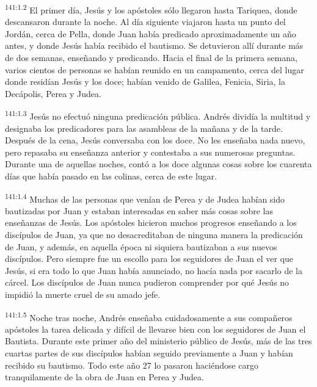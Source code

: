 \par 
\textsuperscript{141:1.2} El primer día, Jesús y los apóstoles sólo llegaron hasta Tariquea, donde descansaron durante la noche. Al día siguiente viajaron hasta un punto del Jordán, cerca de Pella, donde Juan había predicado aproximadamente un año antes, y donde Jesús había recibido el bautismo. Se detuvieron allí durante más de dos semanas, enseñando y predicando. Hacia el final de la primera semana, varios cientos de personas se habían reunido en un campamento, cerca del lugar donde residían Jesús y los doce; habían venido de Galilea, Fenicia, Siria, la Decápolis, Perea y Judea.

\par 
\textsuperscript{141:1.3} Jesús no efectuó ninguna predicación pública. Andrés dividía la multitud y designaba los predicadores para las asambleas de la mañana y de la tarde. Después de la cena, Jesús conversaba con los doce. No les enseñaba nada nuevo, pero repasaba su enseñanza anterior y contestaba a sus numerosas preguntas. Durante una de aquellas noches, contó a los doce algunas cosas sobre los cuarenta días que había pasado en las colinas, cerca de este lugar.

\par 
\textsuperscript{141:1.4} Muchas de las personas que venían de Perea y de Judea habían sido bautizadas por Juan y estaban interesadas en saber más cosas sobre las enseñanzas de Jesús. Los apóstoles hicieron muchos progresos enseñando a los discípulos de Juan, ya que no desacreditaban de ninguna manera la predicación de Juan, y además, en aquella época ni siquiera bautizaban a sus nuevos discípulos. Pero siempre fue un escollo para los seguidores de Juan el ver que Jesús, si era todo lo que Juan había anunciado, no hacía nada por sacarlo de la cárcel. Los discípulos de Juan nunca pudieron comprender por qué Jesús no impidió la muerte cruel de su amado jefe.

\par 
\textsuperscript{141:1.5} Noche tras noche, Andrés enseñaba cuidadosamente a sus compañeros apóstoles la tarea delicada y difícil de llevarse bien con los seguidores de Juan el Bautista. Durante este primer año del ministerio público de Jesús, más de las tres cuartas partes de sus discípulos habían seguido previamente a Juan y habían recibido su bautismo. Todo este año 27 lo pasaron haciéndose cargo tranquilamente de la obra de Juan en Perea y Judea.

